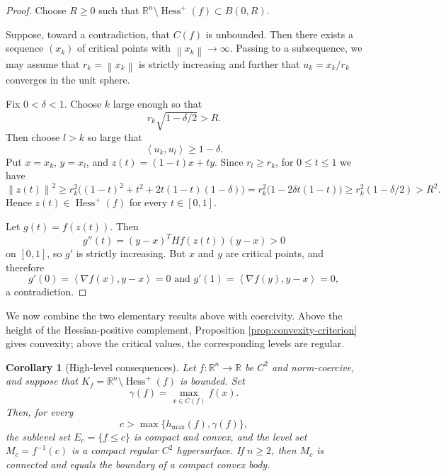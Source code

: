 \documentclass[11pt]{amsart}
\newtheorem{corollary}[theorem]{Corollary}
\theoremstyle{remark}
\newcommand{\Hessp}{\operatorname{Hess}^{+}}
\newcommand{\R}{\mathbb{R}}
\newcommand{\ip}[2]{\left\langle #1,#2\right\rangle}
\newcommand{\norm}[1]{\left\lVert #1\right\rVert}
\begin{document}
\begin{proof}
Choose $R\ge0$ such that $
 \R^n\setminus\Hessp(f)\subset B(0,R)$.

Suppose, toward a contradiction, that $C(f)$ is unbounded. Then there exists a sequence $(x_k)$ of critical points with $\norm{x_k}\to\infty$. Passing to a subsequence, we
may assume that $r_k=\norm{x_k}$ is strictly increasing and further that
$u_k=x_k/r_k$ converges in the unit sphere.

Fix $0<\delta<1$. Choose $k$ large enough so that
\[
 r_k\sqrt{1-\delta/2}>R.
\]
Then choose $l>k$ so large that
\[
 \ip{u_k}{u_l}\ge1-\delta.
\]
Put $x=x_k$, $y=x_l$, and $z(t)=(1-t)x+ty$. Since $r_l\ge r_k$, for
$0\le t\le1$ we have
\[
 \norm{z(t)}^2
 \ge r_k^2\bigl((1-t)^2+t^2+2t(1-t)(1-\delta)\bigr)
 =r_k^2\bigl(1-2\delta t(1-t)\bigr)
 \ge r_k^2(1-\delta/2)>R^2.
\]
Hence $z(t)\in\Hessp(f)$ for every $t\in[0,1]$.

Let $g(t)=f(z(t))$. Then
\[
 g''(t)=(y-x)^T Hf(z(t))(y-x)>0
\]
on $[0,1]$, so $g'$ is strictly increasing. But $x$ and $y$ are critical
points, and therefore
\[
 g'(0)=\ip{\nabla f(x)}{y-x}=0
 \text{ and }
 g'(1)=\ip{\nabla f(y)}{y-x}=0,
\]
a contradiction.
\end{proof}

We now combine the two elementary results above with coercivity. Above the height of the Hessian-positive complement, Proposition \ref{prop:convexity-criterion} gives convexity; above the critical values, the corresponding levels are regular. 

\begin{corollary}[High-level consequences]\label{cor:high-level-consequences}
Let $f:\R^n\to\R$ be $C^2$ and norm-coercive, and suppose that
$K_f=\R^n\setminus\Hessp(f)$ is bounded. Set
\[
 \gamma(f)=\max_{x\in C(f)} f(x).
\]
Then, for every
\[
 c>\max\{h_{\max}(f),\gamma(f)\},
\]
the sublevel set $E_c=\{f\le c\}$ is compact and convex, and the level set
$M_c=f^{-1}(c)$ is a compact regular $C^2$ hypersurface. If $n\ge2$, then
$M_c$ is connected and equals the boundary of a compact convex body.
\end{corollary}
\end{document}
